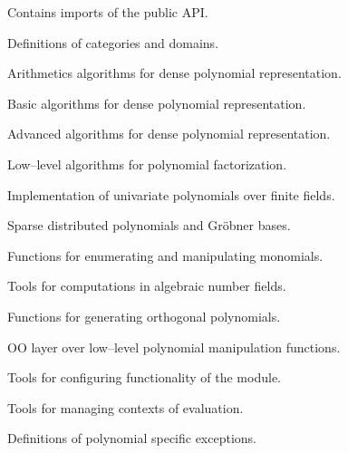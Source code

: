 \begin{description}
\item[] \leavevmode
Contains imports of the public API.

\item[] \leavevmode
Definitions of categories and domains.

\item[] \leavevmode
Arithmetics algorithms for dense polynomial representation.

\item[] \leavevmode
Basic algorithms for dense polynomial representation.

\item[] \leavevmode
Advanced algorithms for dense polynomial representation.

\item[] \leavevmode
Low--level algorithms for polynomial factorization.

\item[] \leavevmode
Implementation of univariate polynomials over finite fields.

\item[] \leavevmode
Sparse distributed polynomials and Gröbner bases.

\item[] \leavevmode
Functions for enumerating and manipulating monomials.

\item[] \leavevmode
Tools for computations in algebraic number fields.

\item[] \leavevmode
Functions for generating orthogonal polynomials.

\item[] \leavevmode
OO layer over low--level polynomial manipulation functions.

\item[] \leavevmode
Tools for configuring functionality of the module.

\item[] \leavevmode
Tools for managing contexts of evaluation.

\item[] \leavevmode
Definitions of polynomial specific exceptions.


\end{description}
